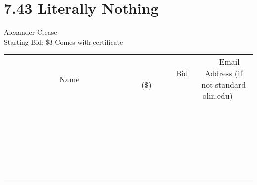 \documentclass[11pt]{article}
\begin{document}
\section*{7.43 Literally Nothing}
Alexander Crease
\\
Starting Bid: \$3
\newline
Comes with certificate
\\[6ex]
\begin{tabular}{c c c}
~~~~~~~~~~~~~Name~~~~~~~~~~~~~ & ~~~~~~~~~Bid (\$)~~~~~~~~~  & ~~~Email Address (if not standard olin.edu)~~~\\
 & & \\
\hline
 & & \\
\hline
 & & \\
\hline
 & & \\
\hline
 & & \\
\hline
 & & \\
\hline
 & & \\
\hline
 & & \\
\hline
 & & \\
\hline
 & & \\
\hline
 & & \\
\hline
 & & \\
\hline
 & & \\
\hline
 & & \\
\hline
 & & \\
\hline
 & & \\
\hline
 & & \\
\hline
 & & \\
\hline
 & & \\
\hline
 & & \\
\hline
 & & \\
\hline
 & & \\
\hline
 & & \\
\hline
 & & \\
\hline
 & & \\
\hline
 & & \\
\hline
\end{tabular}
\newpage
\end{document}
